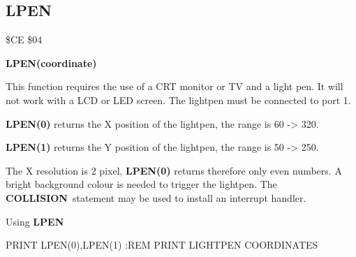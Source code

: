 \subsection{LPEN}
\begin{description}[leftmargin=3cm,style=nextline]
\item [Token:] \$CE \$04
\item [Format:] {\bf LPEN(coordinate)}
\item [Usage:] This function requires the use of a
               CRT monitor or TV and a light pen.
               It will not work with a LCD or LED screen.
               The lightpen must be connected to port 1.

               {\bf LPEN(0)} returns the X position of the lightpen,
               the range is 60 -> 320.

               {\bf LPEN(1)} returns the Y position of the lightpen,
               the range is 50 -> 250.

\item [Remarks:] The X resolution is 2 pixel, {\bf LPEN(0)} returns
                 therefore only even numbers.
                 A bright background colour is needed to trigger
                 the lightpen. The {\bf COLLISION} statement may
                 be used to install an interrupt handler.

\item [Example:] Using {\bf LPEN}
\begin{screenoutput}
 PRINT LPEN(0),LPEN(1)   :REM PRINT LIGHTPEN COORDINATES
\end{screenoutput}
\end{description}

%

